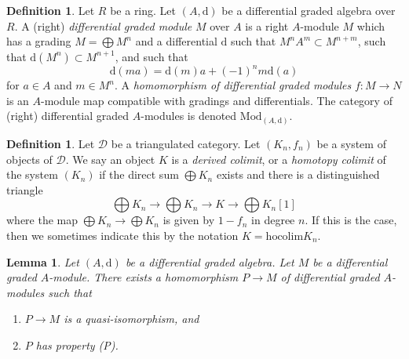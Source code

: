 \documentclass{amsart}
\theoremstyle{plain}
\newtheorem{lemma}[subsection]{Lemma}
\theoremstyle{definition}
\newtheorem{definition}[subsection]{Definition}
\theoremstyle{remark}
\numberwithin{equation}{subsection}
\begin{document}
\begin{definition}
\label{definition-dgm}
Let $R$ be a ring.
Let $(A, \text{d})$ be a differential graded algebra over $R$.
A (right) {\it differential graded module} $M$ over $A$ is a right $A$-module
$M$ which has a grading $M = \bigoplus M^n$ and a differential $\text{d}$
such that $M^n A^m \subset M^{n + m}$, such that
$\text{d}(M^n) \subset M^{n + 1}$, and such that
$$
\text{d}(ma) = \text{d}(m)a + (-1)^n m\text{d}(a)
$$
for $a \in A$ and $m \in M^n$. A
{\it homomorphism of differential graded modules} $f : M \to N$
is an $A$-module map compatible with gradings and differentials.
The category of (right) differential graded $A$-modules is denoted
$\text{Mod}_{(A, \text{d})}$.
\end{definition}

\begin{definition}
\label{derived-definition-derived-colimit}
Let $\mathcal{D}$ be a triangulated category.
Let $(K_n, f_n)$ be a system of objects of $\mathcal{D}$.
We say an object $K$ is a {\it derived colimit}, or a
{\it homotopy colimit} of the system $(K_n)$ if
the direct sum $\bigoplus K_n$ exists and there is a distinguished triangle
$$
\bigoplus K_n \to \bigoplus K_n \to K \to \bigoplus K_n[1]
$$
where the map $\bigoplus K_n \to \bigoplus K_n$ is given
by $1 - f_n$ in degree $n$. If this is the
case, then we sometimes indicate this by the notation
$K = \text{hocolim} K_n$.
\end{definition}

\begin{lemma}
\label{lemma-resolve}
Let $(A, \text{d})$ be a differential graded algebra.
Let $M$ be a differential graded $A$-module. There exists a homomorphism
$P \to M$ of differential graded $A$-modules such that
\begin{enumerate}
\item $P \to M$ is a quasi-isomorphism, and
\item $P$ has property (P).
\end{enumerate}
\end{lemma}
\end{document}
